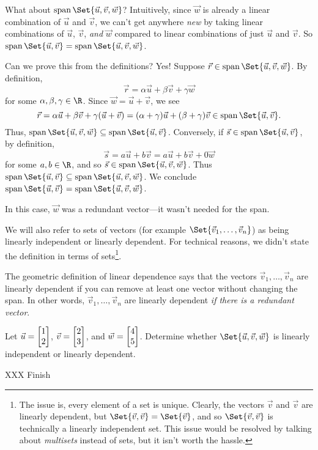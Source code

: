 What about $\Span\Set{\vec u,\vec v,\vec w}$? Intuitively, since $\vec w$ is already
a linear combination of $\vec u$ and $\vec v$, we can't get anywhere \emph{new} by
taking linear combinations of $\vec u$, $\vec v$, \emph{and} $\vec w$ compared to linear combinations
of just $\vec u$ and $\vec v$. So $\Span\Set{\vec u,\vec v}=\Span\Set{\vec u,\vec v,\vec w}$.

Can we prove this from the definitions? Yes! Suppose $\vec r\in \Span\Set{\vec u,\vec v,\vec w}$.
By definition,
\[
	\vec r=\alpha\vec u+\beta\vec v+\gamma\vec w
\] for some $\alpha,\beta,\gamma\in\R$. Since $\vec w=\vec u+\vec v$, we see
\[
	\vec r=\alpha\vec u+\beta\vec v+\gamma(\vec u+\vec v) 
	= (\alpha+\gamma)\vec u+(\beta+\gamma)\vec v\in\Span\Set{\vec u,\vec v}.
\]
Thus, $\Span\Set{\vec u,\vec v,\vec w}\subseteq \Span\Set{\vec u,\vec v}$. Conversely, if $\vec s\in\Span\Set{\vec u,\vec v}$,
by definition,
\[
	\vec s=a\vec u+b\vec v=a\vec u+b\vec v+0\vec w
\]
for some $a,b\in \R$,
and so $\vec s\in\Span\Set{\vec u,\vec v,\vec w}$. Thus $\Span\Set{\vec u,\vec v}\subseteq\Span\Set{\vec u,\vec v,\vec w}$.
We conclude $\Span\Set{\vec u,\vec v}=\Span\Set{\vec u,\vec v,\vec w}$.

In this case, $\vec w$ was a redundant vector---it wasn't needed for the span.


We will also refer to sets of vectors (for example $\Set{\vec v_1,\ldots,\vec v_n}$) as being linearly
independent or linearly dependent. For technical reasons, we didn't state the definition in terms
of sets\footnote{ The issue is, every element of a set is unique. Clearly, the vectors $\vec v$ and $\vec v$
are linearly dependent, but $\Set{\vec v,\vec v}=\Set{\vec v}$, and so $\Set{\vec v,\vec v}$ is technically
a linearly independent set. This issue would be resolved by talking about \emph{multisets} instead of sets,
but it isn't worth the hassle.}.

The geometric definition of linear dependence says that the vectors $\vec v_1,\ldots,\vec v_n$ are linearly dependent
if you can remove at least one vector without changing the span. In other words, $\vec v_1,\ldots,\vec v_n$ 
are linearly dependent \emph{if there is a redundant vector}.

\begin{example}
	\label{EXLINDEP}
	Let $\vec u=\mat{1\\2}$, $\vec v=\mat{2\\3}$, and $\vec w=\mat{4\\5}$. Determine whether
	$\Set{\vec u,\vec v,\vec w}$ is linearly independent or linearly dependent.

	XXX Finish
\end{example}

